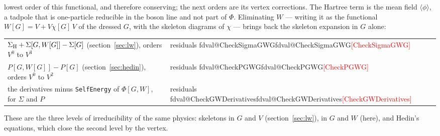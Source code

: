\documentclass[11pt,a4paper]{article}
\makeatletter
\newcommand{\pkg}[1]{\texttt{#1}}
\newcommand{\val}[1]{\ifcsname fdval@#1\endcsname\csname fdval@#1\endcsname\else\textcolor{red}{[#1]}\fi}
\makeatother
\begin{document}
lowest order of this functional, and therefore conserving; the next orders are its vertex corrections. The Hartree term is
the mean field $\langle\phi\rangle$, a tadpole that is one-particle reducible in the boson line and not part of $\Phi$.
Eliminating $W$ --- writing it as the functional $W[G]=V+V\chi[G]\,V$ of the dressed $G$, with the skeleton diagrams
of $\chi$ --- brings back
the skeleton expansion in $G$ alone:
\begin{result}
\begin{tabular}{@{}l@{\quad}l@{}}
$\Sigma_{\rm H}+\Sigma[G,W[G]]-\Sigma[G]$ (section~\ref{sec:lw}), orders $V^0$ to $V^3$ & residuals \val{CheckSigmaGWG}\\
$P[G,W[G]]-P[G]$ (section~\ref{sec:hedin}), orders $V^0$ to $V^2$ & residuals \val{CheckPGWG}\\
the derivatives minus \pkg{SelfEnergy} of $\Phi[G,W]$, for $\Sigma$ and $P$ & residuals \val{CheckGWDerivatives}
\end{tabular}
\end{result}
These are the three levels of irreducibility of the same physics: skeletons in $G$ and $V$ (section~\ref{sec:lw}), in $G$
and $W$ (here), and Hedin's equations, which close the second level by the vertex.
\end{document}
